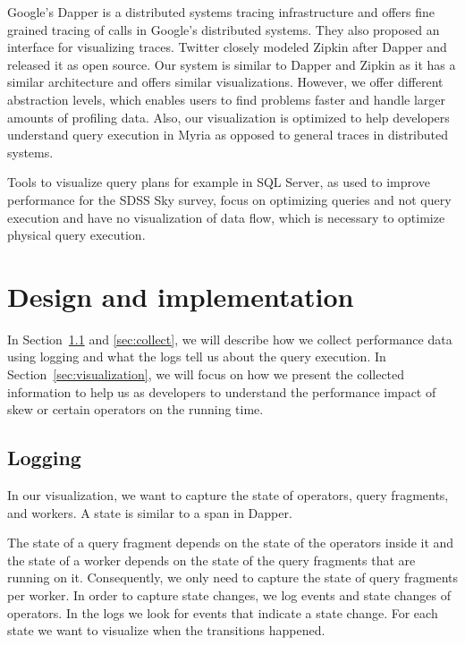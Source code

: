 \documentclass[11pt]{scrartcl}
\begin{document}
Google's Dapper\cite{sigelman2010dapper} is a distributed systems tracing infrastructure and offers fine grained tracing of calls in Google's distributed systems. They also proposed an interface for visualizing traces. Twitter closely modeled Zipkin\cite{zipkin} after Dapper and released it as open source. Our system is similar to Dapper and Zipkin as it has a similar architecture and offers similar visualizations. However, we offer different abstraction levels, which enables users to find problems faster and handle larger amounts of profiling data. Also, our visualization is optimized to help developers understand query execution in Myria as opposed to general traces in distributed systems.

Tools to visualize query plans for example in SQL Server, as used to improve performance for the SDSS Sky survey\cite{szalay2002sdss}, focus on optimizing queries and not query execution and have no visualization of data flow, which is necessary to optimize physical query execution.


\section{Design and implementation}

In Section~\ref{sec:logging} and \ref{sec:collect}, we will describe how we collect performance data using logging and what the logs tell us about the query execution. In Section~\ref{sec:visualization}, we will focus on how we present the collected information to help us as developers to understand the performance impact of skew or certain operators on the running time.

\subsection{Logging}
\label{sec:logging}

In our visualization, we want to capture the state of operators, query fragments, and workers. A state is similar to a span in Dapper\cite{sigelman2010dapper}.

The state of a query fragment depends on the state of the operators inside it and the state of a worker depends on the state of the query fragments that are running on it. Consequently, we only need to capture the state of query fragments per worker. In order to capture state changes, we log events and state changes of operators. In the logs we look for events that indicate a state change. For each state we want to visualize when the transitions happened.
\end{document}
